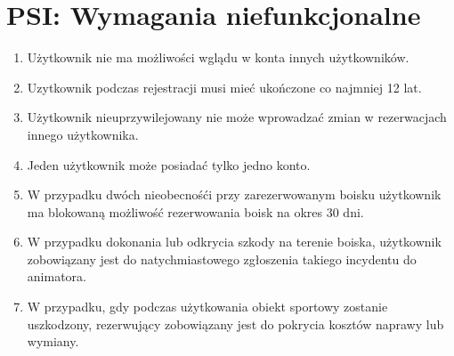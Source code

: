 \documentclass[a4paper,11pt]{article}
\begin{document}
\section {PSI: Wymagania niefunkcjonalne}
\begin{enumerate}
	\item Użytkownik nie ma możliwości wglądu w konta innych użytkowników.
	\item Uzytkownik podczas rejestracji musi mieć ukończone co najmniej 12 lat.
	\item Użytkownik nieuprzywilejowany nie może wprowadzać zmian w rezerwacjach innego użytkownika.
	\item Jeden użytkownik może posiadać tylko jedno konto.
	\item W przypadku dwóch nieobecnośći przy zarezerwowanym boisku użytkownik ma blokowaną możliwość rezerwowania boisk na okres 30 dni.
	\item W przypadku dokonania lub odkrycia szkody na terenie boiska, użytkownik zobowiązany jest do natychmiastowego zgłoszenia takiego incydentu do animatora. 
	\item W przypadku, gdy podczas użytkowania obiekt sportowy zostanie uszkodzony, rezerwujący zobowiązany jest do pokrycia kosztów naprawy lub wymiany. 
\end{enumerate}
\end{document}
